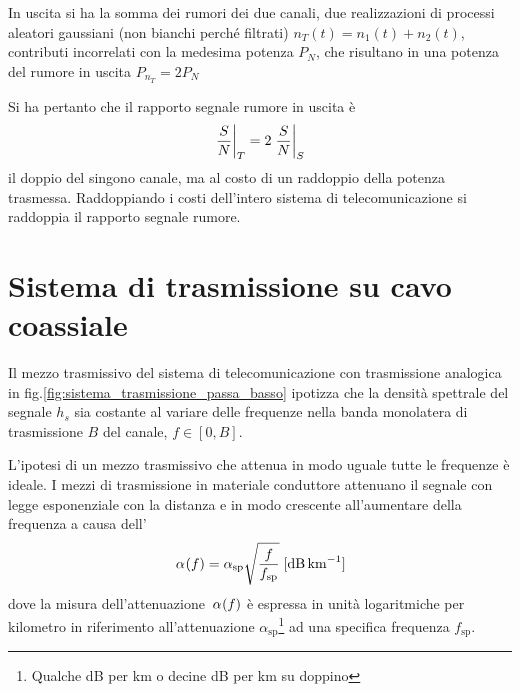 In uscita si ha la somma dei rumori dei due canali, due realizzazioni di processi aleatori gaussiani (non bianchi perché filtrati)
$n_T(t)=n_1(t)+n_2(t)$, contributi incorrelati con la medesima potenza $P_N$, che risultano in una potenza del rumore in uscita
$P_{n_T}=2 P_N$

Si ha pertanto che il rapporto segnale rumore in uscita è
\[\left.{\frac{S}{N}}\right\rvert_{T}=2\left.{\frac{S}{N}}\right\rvert_{S}\]
il doppio del singono canale, ma al costo di un raddoppio della potenza trasmessa.
Raddoppiando i costi dell'intero sistema di telecomunicazione si raddoppia il rapporto segnale rumore.

\section{Sistema di trasmissione su cavo coassiale}
Il mezzo trasmissivo del sistema di telecomunicazione con trasmissione analogica in fig.\ref{fig:sistema_trasmissione_passa_basso} ipotizza che la densità spettrale del segnale $h_s$ sia costante al variare delle frequenze nella banda monolatera di trasmissione $B$ del canale, $f\in[0,B]$.

L'ipotesi di un mezzo trasmissivo che attenua in modo uguale tutte le frequenze è ideale. I mezzi di trasmissione in materiale conduttore attenuano il segnale con legge esponenziale con la distanza e in modo crescente all'aumentare della frequenza a causa dell'
\begin{equation}
\f{\alpha}{f}=\alpha_\text{sp}\sqrt{\frac{f}{f_\text{sp}}}\;[\si{\decibel\per\kilo\meter}]
\label{eq:attenuazione_esponenziale}
\end{equation}
dove la misura dell'attenuazione $\,{\alpha}^{}\!\left({f}\right)$ è espressa in unità logaritmiche per kilometro in riferimento all'attenuazione $\alpha_\text{sp}$\footnote{Qualche dB per km o decine dB per km su doppino} ad una specifica frequenza $f_\text{sp}$.

